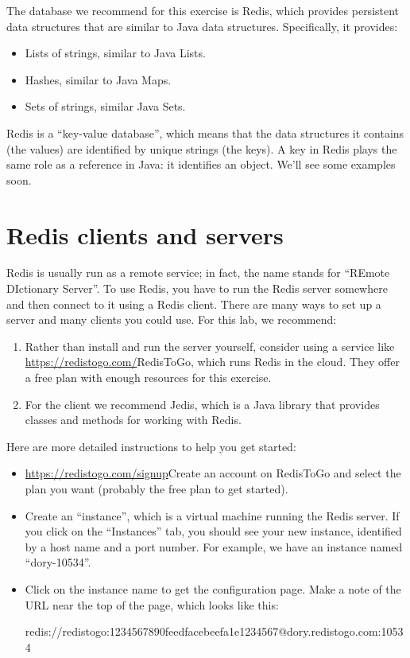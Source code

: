 \documentclass[12pt]{book}
\theoremstyle{exercise}
\begin{document}
The database we recommend for this exercise is Redis, which provides
persistent data structures that are similar to Java data structures.
Specifically, it provides:

\begin{itemize}
\itemsep1pt\parskip0pt
\item
  Lists of strings, similar to Java Lists.
\item
  Hashes, similar to Java Maps.
\item
  Sets of strings, similar Java Sets.
\end{itemize}

Redis is a ``key-value database'', which means that the data structures
it contains (the values) are identified by unique strings (the keys). A
key in Redis plays the same role as a reference in Java: it identifies
an object. We'll see some examples soon.

\section{Redis clients and servers}\label{redis-clients-and-servers}

Redis is usually run as a remote service; in fact, the name stands for
``REmote DIctionary Server''. To use Redis, you have to run the Redis
server somewhere and then connect to it using a Redis client. There are
many ways to set up a server and many clients you could use. For this
lab, we recommend:

\begin{enumerate}
\def\labelenumi{\arabic{enumi}.}
\item
  Rather than install and run the server yourself, consider using a
  service like \url{https://redistogo.com/}{RedisToGo}, which runs
  Redis in the cloud. They offer a free plan with enough resources for
  this exercise.
\item
  For the client we recommend Jedis, which is a Java library that
  provides classes and methods for working with Redis.
\end{enumerate}

Here are more detailed instructions to help you get started:

\begin{itemize}
\item
  \url{https://redistogo.com/signup}{Create an account on RedisToGo}
  and select the plan you want (probably the free plan to get started).
\item
  Create an ``instance'', which is a virtual machine running the Redis
  server. If you click on the ``Instances'' tab, you should see your new
  instance, identified by a host name and a port number. For example, we
  have an instance named ``dory-10534''.
\item
  Click on the instance name to get the configuration page. Make a note
  of the URL near the top of the page, which looks like this:

  redis://redistogo:1234567890feedfacebeefa1e1234567@dory.redistogo.com:10534
\end{itemize}
\end{document}
